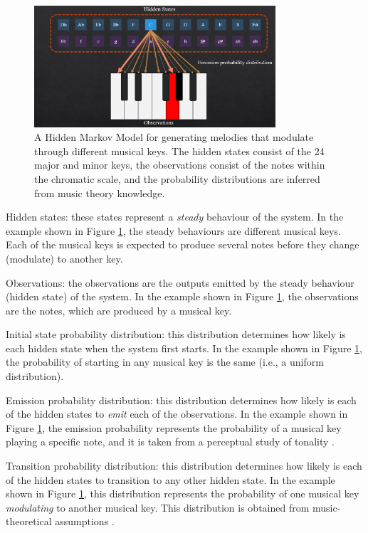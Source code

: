 \begin{figure}[h]
    \centering
    \includegraphics[width=0.8\textwidth]{figures/Q1_1.png}
    \caption{A Hidden Markov Model for generating melodies that modulate through different musical keys. The hidden states consist of the 24 major and minor keys, the observations consist of the notes within the chromatic scale, and the probability distributions are inferred from music theory knowledge.}
    \label{fig:Q1_1}
\end{figure}



 
 Hidden states: these states represent a \emph{steady} behaviour of the system. In the example shown in Figure \ref{fig:Q1_1}, the steady behaviours are different musical keys. Each of the musical keys is expected to produce several notes before they change (modulate) to another key.
 
 Observations: the observations are the outputs emitted by the steady behaviour (hidden state) of the system. In the example shown in Figure \ref{fig:Q1_1}, the observations are the notes, which are produced by a musical key.
 
Initial state probability distribution: this distribution determines how likely is each hidden state when the system first starts. In the example shown in Figure \ref{fig:Q1_1}, the probability of starting in any musical key is the same (i.e., a uniform distribution).

Emission probability distribution: this distribution determines how likely is each of the hidden states to \emph{emit} each of the observations. In the example shown in Figure \ref{fig:Q1_1}, the emission probability represents the probability of a musical key playing a specific note, and it is taken from a perceptual study of tonality \cite{krumhansl_tracing_1982}.

Transition probability distribution: this distribution determines how likely is each of the hidden states to transition to any other hidden state. In the example shown in Figure \ref{fig:Q1_1}, this distribution represents the probability of one musical key \emph{modulating} to another musical key. This distribution is obtained from music-theoretical assumptions \cite{weber_theory_2018}.

